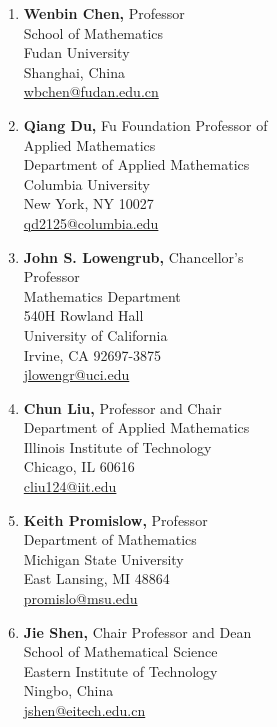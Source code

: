 \documentclass[11pt]{letter}
\begin{document}
	\begin{multicols}{2}

	
	
	\begin{enumerate}
	\item
\textbf{Wenbin Chen,} Professor
	\\
School of Mathematics
	\\
Fudan University
	\\
Shanghai, China
	\\
\url{wbchen@fudan.edu.cn}
	
	\item	
\textbf{Qiang Du,} Fu Foundation Professor of 
	\\
\hspace*{0.25in} Applied Mathematics
	\\
Department of Applied Mathematics
	\\
Columbia University
	\\
New York, NY 10027
	\\
\url{qd2125@columbia.edu}

	\item
\textbf{John S. Lowengrub,} Chancellor's 
	\\
\hspace*{0.25in} Professor
	\\
Mathematics Department
 	\\
540H Rowland Hall
	\\
University of California
	\\
Irvine, CA 92697-3875
	\\
\url{jlowengr@uci.edu}

	\item
\textbf{Chun Liu,} Professor and Chair
	\\
Department of Applied Mathematics
	\\
Illinois Institute of Technology
	\\
Chicago, IL 60616 
	\\
\url{cliu124@iit.edu}
	
	\columnbreak
	
	\item
\textbf{Keith Promislow,} Professor
	\\
Department of Mathematics
	\\
Michigan State University
	\\
East Lansing, MI 48864
	\\
\url{promislo@msu.edu}
	
	\item
\textbf{Jie Shen,} Chair Professor and Dean
	\\
School of Mathematical Science
	\\
Eastern Institute of Technology
	\\
Ningbo, China
	\\
\url{jshen@eitech.edu.cn}


\end{enumerate}
\end{multicols}
\end{document}
